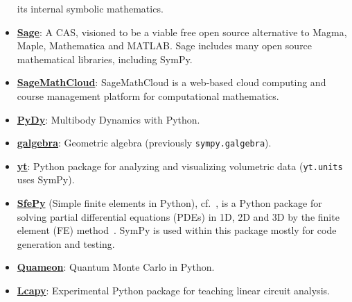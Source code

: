 \begin{itemize}
  its internal symbolic mathematics.
\item
  \href{http://www.sagemath.org/}{\textbf{Sage}}: A CAS, visioned to be
  a viable free open source alternative to Magma, Maple, Mathematica and
  MATLAB\@. Sage includes many open source mathematical libraries, including
  SymPy.
\item
  \href{https://cloud.sagemath.com}{\textbf{SageMathCloud}}:
  SageMathCloud is a web-based cloud computing and course management
  platform for computational mathematics.
\item
  \href{http://www.pydy.org/}{\textbf{PyDy}}: Multibody Dynamics with
  Python.
\item
  \href{https://github.com/brombo/galgebra}{\textbf{galgebra}}:
  Geometric algebra (previously \texttt{sympy.galgebra}).
\item
  \href{http://yt-project.org/}{\textbf{yt}}: Python package for
  analyzing and visualizing volumetric data (\texttt{yt.units} uses SymPy).
\item
  \href{http://sfepy.org/}{\textbf{SfePy}} (Simple finite elements in Python),
  cf.~\cite{cimrman2014sfepy}, is a Python package for solving partial
  differential equations (PDEs) in 1D, 2D and 3D by the finite element (FE)
  method~\cite{Zienkiewicz2013FEM}. SymPy is used within this package mostly for
  code generation and testing.
\item
  \href{http://quameon.sourceforge.net/}{\textbf{Quameon}}: Quantum
  Monte Carlo in Python.
\item
  \href{http://lcapy.elec.canterbury.ac.nz/}{\textbf{Lcapy}}:
  Experimental Python package for teaching linear circuit analysis.
\end{itemize}

